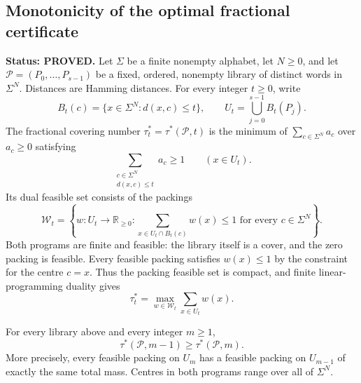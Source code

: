 \subsection{Monotonicity of the optimal fractional certificate}
\label{app:mismatch-monotonicity}

\noindent\textbf{Status: PROVED.}
Let $\Sigma$ be a finite nonempty alphabet, let $N\geq 0$, and let
$\mathcal P=(P_0,\ldots,P_{s-1})$ be a fixed, ordered, nonempty library of
distinct words in $\Sigma^N$. Distances are Hamming distances. For every
integer $t\geq 0$, write
\[
 B_t(c)=\{x\in\Sigma^N:d(x,c)\leq t\},
 \qquad U_t=\bigcup_{j=0}^{s-1}B_t(P_j).
\]
The fractional covering number $\tau_t^*=\tau^*(\mathcal P,t)$ is the
minimum of $\sum_{c\in\Sigma^N}a_c$ over $a_c\geq 0$ satisfying
\[
 \sum_{\substack{c\in\Sigma^N\\d(x,c)\leq t}}a_c\geq 1
 \qquad(x\in U_t).
\]
Its dual feasible set consists of the packings
\[
 \mathcal W_t=\left\{w:U_t\longrightarrow\mathbb R_{\geq0}:
     \sum_{x\in U_t\cap B_t(c)}w(x)\leq1
     \text{ for every }c\in\Sigma^N\right\}.
\]
Both programs are finite and feasible: the library itself is a cover, and
the zero packing is feasible. Every feasible packing satisfies $w(x)\leq1$
by the constraint for the centre $c=x$. Thus the packing feasible set is
compact, and finite linear-programming duality gives
\[
 \tau_t^*=\max_{w\in\mathcal W_t}\sum_{x\in U_t}w(x).
\]

\begin{proposition}
\label{prop:mismatch-monotonicity}
For every library above and every integer $m\geq1$,
\[
 \boxed{\tau^*(\mathcal P,m-1)\geq\tau^*(\mathcal P,m).}
\]
More precisely, every feasible packing on $U_m$ has a feasible packing on
$U_{m-1}$ of exactly the same total mass. Centres in both programs range
over all of $\Sigma^N$.
\end{proposition}

